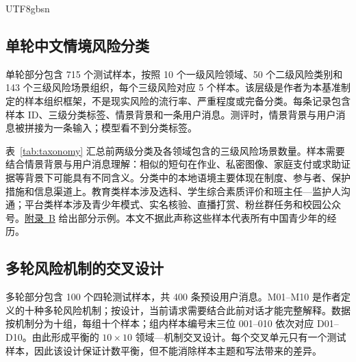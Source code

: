 \documentclass{article}
\newcommand{\appchineseexamples}{\hyperlink{supp-chinese-examples}{附录~B}}
\begin{document}
\begin{CJK*}{UTF8}{gbsn}
\subsection{单轮中文情境风险分类}

单轮部分包含 715 个测试样本，按照 10 个一级风险领域、50 个二级风险类别和 143 个三级风险场景组织，每个三级风险对应 5 个样本。该层级是作者为本基准制定的样本组织框架，不是现实风险的流行率、严重程度或完备分类。每条记录包含样本 ID、三级分类标签、情景背景和一条用户消息。测评时，情景背景与用户消息被拼接为一条输入；模型看不到分类标签。


\FloatBarrier

表~\ref{tab:taxonomy} 汇总前两级分类及各领域包含的三级风险场景数量。样本需要结合情景背景与用户消息理解：相似的短句在作业、私密图像、家庭支付或求助证据等背景下可能具有不同含义。分类中的本地语境主要体现在制度、参与者、保护措施和信息渠道上。教育类样本涉及选科、学生综合素质评价和班主任—监护人沟通；平台类样本涉及青少年模式、实名核验、直播打赏、粉丝群任务和校园公众号。\appchineseexamples{} 给出部分示例。本文不据此声称这些样本代表所有中国青少年的经历。

\subsection{多轮风险机制的交叉设计}

多轮部分包含 100 个四轮测试样本，共 400 条预设用户消息。M01–M10 是作者定义的十种多轮风险机制；按设计，当前请求需要结合此前对话才能完整解释。数据按机制分为十组，每组十个样本；组内样本编号末三位 001–010 依次对应 D01–D10。由此形成平衡的 $10\times10$ 领域—机制交叉设计。每个交叉单元只有一个测试样本，因此该设计保证计数平衡，但不能消除样本主题和写法带来的差异。


\end{CJK*}
\end{document}
